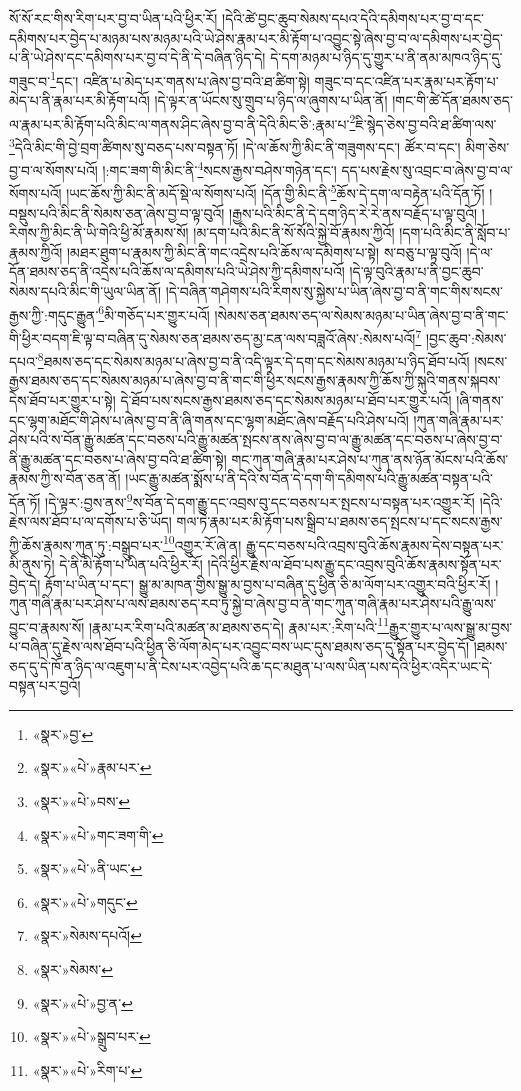སོ་སོ་རང་གིས་རིག་པར་བྱ་བ་ཡིན་པའི་ཕྱིར་རོ། །དེའི་ཚེ་བྱང་ཆུབ་སེམས་དཔའ་དེའི་དམིགས་པར་བྱ་བ་དང་དམིགས་པར་བྱེད་པ་མཉམ་པས་མཉམ་པའི་ཡེ་ཤེས་རྣམ་པར་མི་རྟོག་པ་འབྱུང་སྟེ་ཞེས་བྱ་བ་ལ་དམིགས་པར་བྱེད་པ་ནི་ཡེ་ཤེས་དང་དམིགས་པར་བྱ་བ་དེ་ནི་དེ་བཞིན་ཉིད་དེ། དེ་དག་མཉམ་པ་ཉིད་དུ་གྱུར་པ་ནི་ནམ་མཁའ་ཉིད་དུ་གཟུང་བ་\footnote{«སྣར་»བྱ་}དང་། འཛིན་པ་མེད་པར་གནས་པ་ཞེས་བྱ་བའི་ཐ་ཚིག་སྟེ། གཟུང་བ་དང་འཛིན་པར་རྣམ་པར་རྟོག་པ་མེད་པ་ནི་རྣམ་པར་མི་རྟོག་པའོ། །དེ་ལྟར་ན་ཡོངས་སུ་གྲུབ་པ་ཉིད་ལ་ཞུགས་པ་ཡིན་ནོ། །གང་གི་ཚེ་དོན་ཐམས་ཅད་ལ་རྣམ་པར་མི་རྟོག་པའི་མིང་ལ་གནས་ཤིང་ཞེས་བྱ་བ་ནི་དེའི་མིང་ཅི་:རྣམ་པ་\footnote{«སྣར་»«པེ་»རྣམ་པར་}ཇི་སྙེད་ཅེས་བྱ་བའི་ཐ་ཚིག་ལས་\footnote{«སྣར་»«པེ་»བས་}དེའི་མིང་གི་བྱེ་བྲག་ཚིགས་སུ་བཅད་པས་བསྟན་ཏོ། །དེ་ལ་ཆོས་ཀྱི་མིང་ནི་གཟུགས་དང་། ཚོར་བ་དང་། མིག་ཅེས་བྱ་བ་ལ་སོགས་པའོ། །:གང་ཟག་གི་མིང་ནི་\footnote{«སྣར་»«པེ་»གང་ཟག་གི་}སངས་རྒྱས་བཤེས་གཉེན་དང་། དད་པས་རྗེས་སུ་འབྲང་བ་ཞེས་བྱ་བ་ལ་སོགས་པའོ། །ཡང་ཆོས་ཀྱི་མིང་ནི་མདོ་སྡེ་ལ་སོགས་པའོ། །དོན་གྱི་མིང་ནི་\footnote{«སྣར་»«པེ་»ནི་ཡང་}ཆོས་དེ་དག་ལ་བརྟེན་པའི་དོན་ཏོ། །བསྡུས་པའི་མིང་ནི་སེམས་ཅན་ཞེས་བྱ་བ་ལྟ་བུའོ། །རྒྱས་པའི་མིང་ནི་དེ་དག་ཉིད་རེ་རེ་ནས་བརྗོད་པ་ལྟ་བུའོ། །རིགས་ཀྱི་མིང་ནི་ཡི་གེའི་ཕྱི་མོ་རྣམས་སོ། །མ་དག་པའི་མིང་ནི་སོ་སོའི་སྐྱེ་བོ་རྣམས་ཀྱིའོ། །དག་པའི་མིང་ནི་སློབ་པ་རྣམས་ཀྱིའོ། །མཐར་ཐུག་པ་རྣམས་ཀྱི་མིང་ནི་གང་འདྲེས་པའི་ཆོས་ལ་དམིགས་པ་སྟེ། ས་བཅུ་པ་ལྟ་བུའོ། །དེ་ལ་དོན་ཐམས་ཅད་ནི་འདྲེས་པའི་ཆོས་ལ་དམིགས་པའི་ཡེ་ཤེས་ཀྱི་དམིགས་པའོ། །དེ་ལྟ་བུའི་རྣམ་པ་ནི་བྱང་ཆུབ་སེམས་དཔའི་མིང་གི་ཡུལ་ཡིན་ནོ། །དེ་བཞིན་གཤེགས་པའི་རིགས་སུ་སྐྱེས་པ་ཡིན་ཞེས་བྱ་བ་ནི་གང་གིས་སངས་རྒྱས་ཀྱི་:གདུང་རྒྱུན་\footnote{«སྣར་»«པེ་»གདུང་}མི་གཅོད་པར་གྱུར་པའོ། །སེམས་ཅན་ཐམས་ཅད་ལ་སེམས་མཉམ་པ་ཡིན་ཞེས་བྱ་བ་ནི་གང་གི་ཕྱིར་བདག་ཇི་ལྟ་བ་བཞིན་དུ་སེམས་ཅན་ཐམས་ཅད་མྱ་ངན་ལས་བཟླའོ་ཞེས་:སེམས་པའོ།\footnote{«སྣར་»སེམས་དཔའོ།} །བྱང་ཆུབ་:སེམས་དཔའ་\footnote{«སྣར་»སེམས་}ཐམས་ཅད་དང་སེམས་མཉམ་པ་ཞེས་བྱ་བ་ནི་འདི་ལྟར་དེ་དག་དང་སེམས་མཉམ་པ་ཉིད་ཐོབ་པའོ། །སངས་རྒྱས་ཐམས་ཅད་དང་སེམས་མཉམ་པ་ཞེས་བྱ་བ་ནི་གང་གི་ཕྱིར་སངས་རྒྱས་རྣམས་ཀྱི་ཆོས་ཀྱི་སྐུའི་གནས་སྐབས་དེས་ཐོབ་པར་གྱུར་པ་སྟེ། དེ་ཐོབ་པས་སངས་རྒྱས་ཐམས་ཅད་དང་སེམས་མཉམ་པ་ཐོབ་པར་གྱུར་པའོ། །ཞི་གནས་དང་ལྷག་མཐོང་གི་ཤེས་པ་ཞེས་བྱ་བ་ནི་ཞི་གནས་དང་ལྷག་མཐོང་ཞེས་བརྗོད་པའི་ཤེས་པའོ། །ཀུན་གཞི་རྣམ་པར་ཤེས་པའི་ས་བོན་རྒྱུ་མཚན་དང་བཅས་པའི་རྒྱུ་མཚན་སྤངས་ནས་ཞེས་བྱ་བ་ལ་རྒྱུ་མཚན་དང་བཅས་པ་ཞེས་བྱ་བ་ནི་རྒྱུ་མཚན་དང་བཅས་པ་ཞེས་བྱ་བའི་ཐ་ཚིག་སྟེ། གང་ཀུན་གཞི་རྣམ་པར་ཤེས་པ་ཀུན་ནས་ཉོན་མོངས་པའི་ཆོས་རྣམས་ཀྱི་ས་བོན་ཅན་ནོ། །ཡང་རྒྱུ་མཚན་སྨོས་པ་ནི་དེའི་ས་བོན་དེ་དག་གི་དམིགས་པའི་རྒྱུ་མཚན་བསྟན་པའི་དོན་ཏོ། །དེ་ལྟར་:བྱས་ནས་\footnote{«སྣར་»«པེ་»བྱ་ན་}ས་བོན་དེ་དག་རྒྱུ་དང་འབྲས་བུ་དང་བཅས་པར་སྤངས་པ་བསྟན་པར་འགྱུར་རོ། །དེའི་རྗེས་ལས་ཐོབ་པ་ལ་དགོས་པ་ཅི་ཡོད། གལ་ཏེ་རྣམ་པར་མི་རྟོག་པས་སྒྲིབ་པ་ཐམས་ཅད་སྤངས་པ་དང་སངས་རྒྱས་ཀྱི་ཆོས་རྣམས་ཀུན་ཏུ་:བསྒྲུབ་པར་\footnote{«སྣར་»«པེ་»སྒྲུབ་པར་}འགྱུར་རོ་ཞེ་ན། རྒྱུ་དང་བཅས་པའི་འབྲས་བུའི་ཆོས་རྣམས་དེས་བསྟན་པར་མི་ནུས་ཏེ། དེ་ནི་མི་རྟོག་པ་ཡིན་པའི་ཕྱིར་རོ། །དེའི་ཕྱིར་རྗེས་ལ་ཐོབ་པས་རྒྱུ་དང་འབྲས་བུའི་ཆོས་རྣམས་སྟོན་པར་བྱེད་དེ། རྟོག་པ་ཡིན་པ་དང་། སྒྱུ་མ་མཁན་གྱིས་སྒྱུ་མ་བྱས་པ་བཞིན་དུ་ཕྱིན་ཅི་མ་ལོག་པར་འགྱུར་བའི་ཕྱིར་རོ། །ཀུན་གཞི་རྣམ་པར་ཤེས་པ་ལས་ཐམས་ཅད་རབ་ཏུ་སྐྱེ་བ་ཞེས་བྱ་བ་ནི་གང་ཀུན་གཞི་རྣམ་པར་ཤེས་པའི་རྒྱུ་ལས་བྱུང་བ་རྣམས་སོ། །རྣམ་པར་རིག་པའི་མཚན་མ་ཐམས་ཅད་དེ། རྣམ་པར་:རིག་པའི་\footnote{«སྣར་»«པེ་»རིག་པ་}རྒྱུར་གྱུར་པ་ལས་སྒྱུ་མ་བྱས་པ་བཞིན་དུ་རྗེས་ལས་ཐོབ་པའི་ཕྱིན་ཅི་ལོག་མེད་པར་འབྱུང་བས་ཡང་དུས་ཐམས་ཅད་དུ་སྟོན་པར་བྱེད་དོ། །ཐམས་ཅད་དུ་དེ་ཁོ་ན་ཉིད་ལ་འཇུག་པ་ནི་ངེས་པར་འབྱེད་པའི་ཆ་དང་མཐུན་པ་ལས་ཡིན་པས་དེའི་ཕྱིར་འདིར་ཡང་དེ་བསྟན་པར་བྱའོ། 